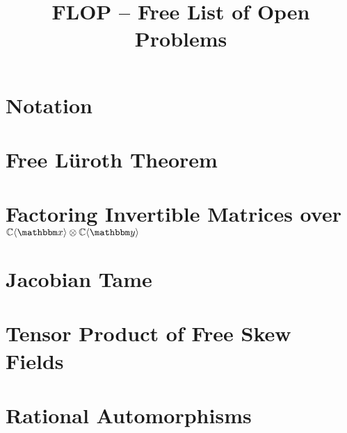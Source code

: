 \documentclass[letterpaper,reqno]{amsart}
\title{FLOP -- Free List of Open Problems}
\numberwithin{equation}{section}
\begin{document}
\maketitle

\tableofcontents


\section{Notation}




\section{Free L{\"u}roth Theorem}



\bigskip

\section{Factoring Invertible Matrices over $\C\fralg{\bbx}\otimes \C\fralg{\bby}$}
	\label{sec:Elem_Mats}



\bigskip


\section{Jacobian Tame}
	\label{sec:Jac Tame}



\bigskip


\section{Tensor Product of Free Skew Fields}
	\label{sec:TPFSF}







\bigskip

\section{Rational Automorphisms}


\end{document}

